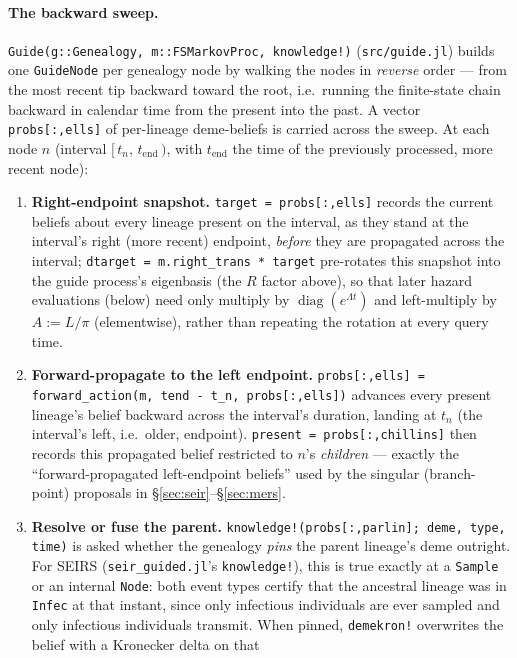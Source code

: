 \documentclass[11pt]{article}
\theoremstyle{plain}
\begin{document}
\paragraph{The backward sweep.} \texttt{Guide(g::Genealogy, m::FSMarkovProc, knowledge!)}
(\texttt{src/guide.jl}) builds one \texttt{GuideNode} per genealogy node by walking the nodes in
\emph{reverse} order --- from the most recent tip backward toward the root, i.e.\ running the
finite-state chain backward in calendar time from the present into the past. A vector
\texttt{probs[:,ells]} of per-lineage deme-beliefs is carried across the sweep. At each node $n$
(interval $[\,t_n,\,t_{\mathrm{end}}\,)$, with $t_{\mathrm{end}}$ the time of the previously
processed, more recent node):
\begin{enumerate}
\item \textbf{Right-endpoint snapshot.} \texttt{target = probs[:,ells]} records the current beliefs
about every lineage present on the interval, as they stand at the interval's right (more recent)
endpoint, \emph{before} they are propagated across the interval; \texttt{dtarget = m.right\_trans *
target} pre-rotates this snapshot into the guide process's eigenbasis (the $R$ factor above), so
that later hazard evaluations (below) need only multiply by $\operatorname{diag}(e^{\Lambda t})$
and left-multiply by $A := L/\pi$ (elementwise), rather than repeating the rotation at every query
time.
\item \textbf{Forward-propagate to the left endpoint.} \texttt{probs[:,ells] =
forward\_action(m, tend - t\_n, probs[:,ells])} advances every present lineage's belief backward
across the interval's duration, landing at $t_n$ (the interval's left, i.e.\ older, endpoint).
\texttt{present = probs[:,chillins]} then records this propagated belief restricted to $n$'s
\emph{children} --- exactly the ``forward-propagated left-endpoint beliefs'' used by the singular
(branch-point) proposals in \S\ref{sec:seir}--\S\ref{sec:mers}.
\item \textbf{Resolve or fuse the parent.} \texttt{knowledge!(probs[:,parlin]; deme, type, time)}
is asked whether the genealogy \emph{pins} the parent lineage's deme outright. For SEIRS
(\texttt{seir\_guided.jl}'s \texttt{knowledge!}), this is true exactly at a \texttt{Sample} or an
internal \texttt{Node}: both event types certify that the ancestral lineage was in \texttt{Infec}
at that instant, since only infectious individuals are ever sampled and only infectious individuals
transmit. When pinned, \texttt{demekron!} overwrites the belief with a Kronecker delta on that

\end{enumerate}
\end{document}
